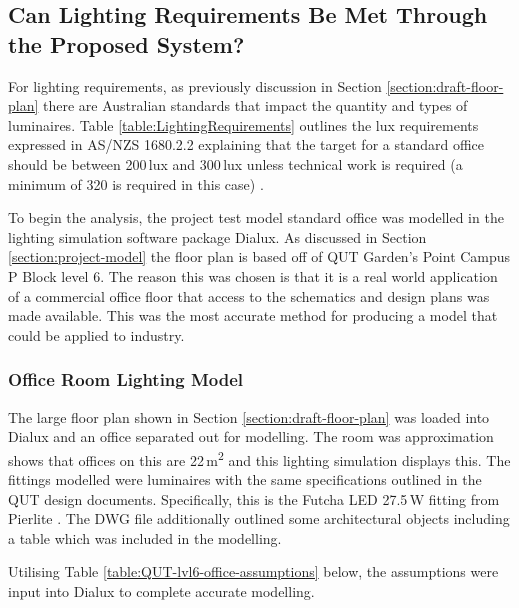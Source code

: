 \subsection{Can Lighting Requirements Be Met Through the Proposed System?} \label{section:question3}

For lighting requirements, as previously discussion in Section \ref{section:draft-floor-plan} there are Australian standards that impact the quantity and types of luminaires. Table \ref{table:LightingRequirements} outlines the lux requirements expressed in AS/NZS 1680.2.2 explaining that the target for a standard office should be between 200\,lux and 300\,lux unless technical work is required (a minimum of 320 is required in this case) \cite{StandardsAustralia2006_2}.
\newline

To begin the analysis, the project test model standard office was modelled in the lighting simulation software package Dialux. As discussed in Section \ref{section:project-model} the floor plan is based off of QUT Garden's Point Campus P Block level 6. The reason this was chosen is that it is a real world application of a commercial office floor that access to the schematics and design plans was made available. This was the most accurate method for producing a model that could be applied to industry. 

\subsubsection{Office Room Lighting Model}   

The large floor plan shown in Section \ref{section:draft-floor-plan} was loaded into Dialux and an office separated out for modelling. The room was approximation shows that offices on this are 22\,\si{m^2} and this lighting simulation displays this. The fittings modelled were luminaires with the same specifications outlined in the QUT design documents. Specifically, this is the Futcha LED 27.5\,W fitting from Pierlite \cite{website:Pierlite1}. The DWG file additionally outlined some architectural objects including a table which was included in the modelling. 
\newline

Utilising Table \ref{table:QUT-lvl6-office-assumptions} below, the assumptions were input into Dialux to complete accurate modelling.
\newline 

